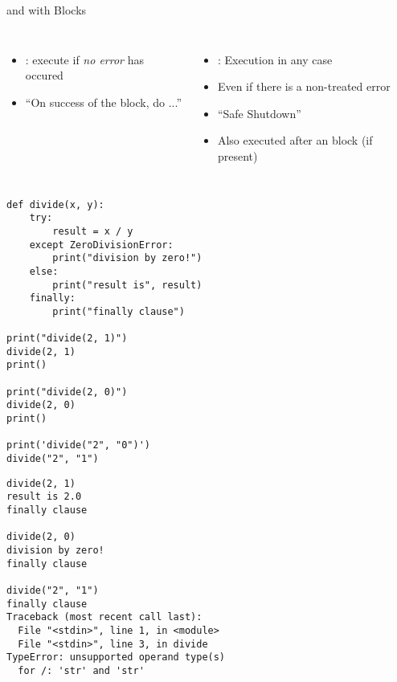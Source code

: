 
\begin{frame}[fragile]{ and  with  Blocks}
%
\begin{columns}[T]
\begin{itemize}
\item {}: execute if \emph{no error} has occured
\item \enquote{On success of the  block, do ...}
\end{itemize}
%
\begin{itemize}
\item {}: Execution in any case
\item Even if there is a non-treated error
\item \enquote{Safe Shutdown}
\item Also executed after an  block (if present)
\end{itemize}
\end{columns}
%
\end{frame}


\begin{frame}[fragile]
%
\begin{tcbraster}[raster columns=2,
                  raster equal height,
                  nobeforeafter,
                  raster column skip=0.5cm]
\begin{codebox}
\begin{verbatim}
def divide(x, y):
    try:
        result = x / y
    except ZeroDivisionError:
        print("division by zero!")
    else:
        print("result is", result)
    finally:
        print("finally clause")

print("divide(2, 1)")
divide(2, 1)
print()

print("divide(2, 0)")
divide(2, 0)
print()

print('divide("2", "0")')
divide("2", "1")
\end{verbatim}
\end{codebox}
%
\begin{cmdbox}
\begin{verbatim}
divide(2, 1)
result is 2.0
finally clause

divide(2, 0)
division by zero!
finally clause

divide("2", "1")
finally clause
Traceback (most recent call last):
  File "<stdin>", line 1, in <module>
  File "<stdin>", line 3, in divide
TypeError: unsupported operand type(s) 
  for /: 'str' and 'str'
\end{verbatim}
\end{cmdbox}
\end{tcbraster}
%
\end{frame}

